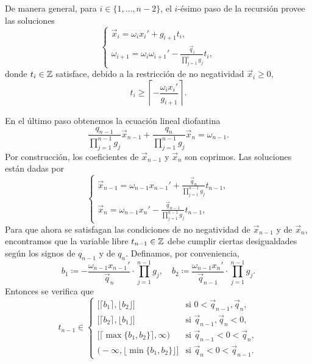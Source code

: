 De manera general, para $i \in \lbrace 1, \ldots, n - 2 \rbrace$, el $i$-ésimo paso de la recursión
provee las soluciones
\begin{equation}
	\label{eq:recurrence}
	\begin{cases}
		\vec{x}_i = \omega_ix_i' + g_{i + 1}t_i, \\
		\omega_{i + 1} = \omega_i\omega_{i + 1}' - \frac{\vec{q}_i}{\prod_{j=1}^{i}g_j}t_i,
	\end{cases}
\end{equation}
donde $t_i \in \mathbb{Z}$ satisface, debido a la restricción de no negatividad $\vec{x}_i \geq 0$,
\begin{equation}
	\label{eq:param-lb}
	t_i \geq \left\lceil -\frac{\omega_ix_i'}{g_{i + 1}} \right\rceil.
\end{equation}

En el último paso obtenemos la ecuación lineal diofantina
\begin{equation}
	\label{eq:last-equation}
	\frac{q_{n-1}}{\prod_{j=1}^{n-1}g_j}\vec{x}_{n-1} +
	\frac{q_{n}}{\prod_{j=1}^{n-1}g_j}\vec{x}_n
	= \omega_{n-1}.
\end{equation}
Por construcción, los coeficientes de $\vec{x}_{n - 1}$ y $\vec{x}_n$ son coprimos. Las soluciones
están dadas por
\begin{equation}
	\label{eq:last-solution}
	\begin{cases}
		\vec{x}_{n-1} = \omega_{n-1}x_{n-1}' + \frac{\vec{q}_n}{\prod_{j=1}^{n-1}g_j}t_{n-1}, \\
		\vec{x}_n = \omega_{n-1}x_n' - \frac{\vec{q}_{n-1}}{\prod_{j=1}^{n-1}g_j}t_{n-1},
	\end{cases}
\end{equation}
Para que ahora se satisfagan las condiciones de no negatividad de $\vec{x}_{n-1}$ y de $\vec{x}_n$,
encontramos que la variable libre $t_{n-1} \in \mathbb{Z}$ debe cumplir ciertas desigualdades según los
signos de $q_{n-1}$ y de $q_n$. Definamos, por conveniencia,
\begin{equation}
	\label{eq:lr-bounds}
	b_1 \coloneq -\frac{\omega_{n-1}x_{n-1}'}{\vec{q}_n} \cdot \prod_{j=1}^{n-1}g_j,
	\quad b_2 \coloneq \frac{\omega_{n-1}x_{n}'}{\vec{q}_{n-1}} \cdot \prod_{j=1}^{n-1}g_j.
\end{equation}
Entonces se verifica que
\begin{equation}
	\label{eq:feasible-param}
	t_{n-1} \in 
	\begin{cases}
		\big[ \lceil b_1 \rceil, \lfloor b_2 \rfloor \big] & \text{si } 0 < \vec{q}_{n-1}, \vec{q}_n, \\
		\big[ \lceil b_2 \rceil, \lfloor b_1 \rfloor \big] & \text{si } \vec{q}_{n-1}, \vec{q}_n < 0, \\
		\big[ \lceil \max\lbrace b_1 ,  b_2 \rbrace \rceil, \infty \big) & \text{si } \vec{q}_{n-1}
		< 0 < \vec{q}_n, \\
		\big( -\infty, \lfloor \min\lbrace b_1, b_2\rbrace \rfloor \big] & \text{si } \vec{q}_n < 0
		< \vec{q}_{n-1}.
	\end{cases}
\end{equation}


